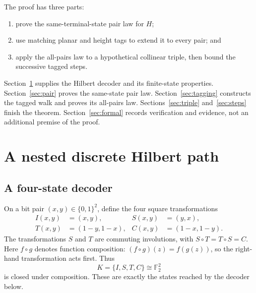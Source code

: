 \documentclass[11pt]{article}
\theoremstyle{definition}
\theoremstyle{remark}
\newcommand{\Ftwo}{\mathbb F_2}
\newcommand{\bits}{\{0,1\}^2}
\begin{document}
The proof has three parts:
\begin{enumerate}[nosep]
\item prove the same-terminal-state pair law for $H$;
\item use matching planar and height tags to extend it to every pair; and
\item apply the all-pairs law to a hypothetical collinear triple, then bound
      the successive tagged steps.
\end{enumerate}
Section~\ref{sec:hilbert} supplies the Hilbert decoder and its finite-state
properties.  Section~\ref{sec:pair} proves the same-state pair law.
Section~\ref{sec:tagging} constructs the tagged walk and proves its all-pairs
law.  Sections~\ref{sec:triple} and~\ref{sec:steps} finish the theorem.
Section~\ref{sec:formal} records verification and evidence, not an additional
premise of the proof.

\section{A nested discrete Hilbert path}\label{sec:hilbert}

\subsection{A four-state decoder}

On a bit pair $(x,y)\in\bits$, define the four square transformations
\[
\begin{aligned}
 I(x,y)&=(x,y),&
 S(x,y)&=(y,x),\\
 T(x,y)&=(1-y,1-x),&
 C(x,y)&=(1-x,1-y).
\end{aligned}
\]
The transformations $S$ and $T$ are commuting involutions, with
$S\circ T=T\circ S=C$.
Here $f\circ g$ denotes function composition:
$(f\circ g)(z)=f(g(z))$, so the right-hand transformation acts first.  Thus
\[
 K=\{I,S,T,C\}\cong\Ftwo^2
\]
is closed under composition.  These are exactly the states reached by the
decoder below.
\end{document}
